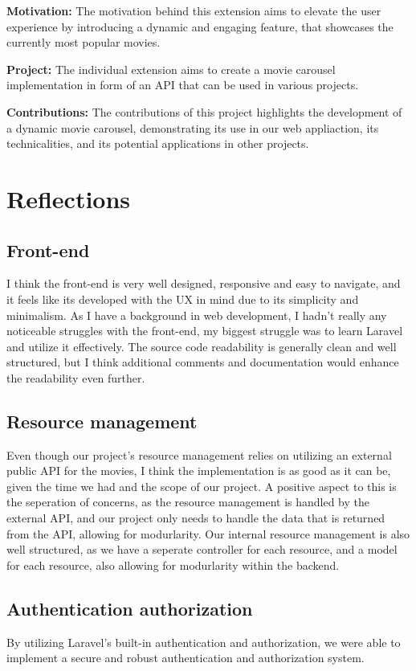 \documentclass[letterpaper,twocolumn]{article}
\begin{document}
\textbf{Motivation:}
The motivation behind this extension aims to elevate the user experience by introducing a dynamic and engaging feature, that showcases the currently most popular movies.

\textbf{Project:}
The individual extension aims to create a movie carousel implementation in form of an API that can be used in various projects.

\textbf{Contributions:}
The contributions of this project highlights the development of a dynamic movie carousel, demonstrating its use in our web appliaction, its technicalities, and its potential applications in other projects.


\section{Reflections}
\subsection{Front-end}
I think the front-end is very well designed, responsive and easy to navigate, and it feels like its developed with the UX in mind due to its simplicity and minimalism.
As I have a background in web development, I hadn't really any noticeable struggles with the front-end, my biggest struggle was to learn Laravel and utilize it effectively.
The source code readability is generally clean and well structured, but I think additional comments and documentation would enhance the readability even further.

\subsection{Resource management}
Even though our project's resource management relies on utilizing an external public API for the movies, I think the implementation is as good as it can be, given the time we had and the scope of our project. 
A positive aspect to this is the seperation of concerns, as the resource management is handled by the external API, and our project only needs to handle the data that is returned from the API, allowing for modurlarity.
Our internal resource management is also well structured, as we have a seperate controller for each resource, and a model for each resource, also allowing for modurlarity within the backend.

\subsection{Authentication authorization}
By utilizing Laravel's built-in authentication and authorization, we were able to implement a secure and robust authentication and authorization system.
\end{document}
